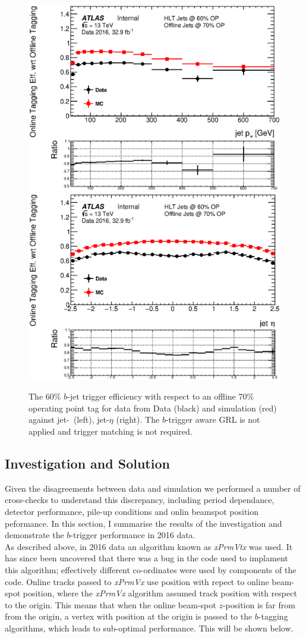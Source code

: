 \begin{figure}[!ht]
  \begin{center}
    \includegraphics[width=0.48\linewidth, angle=0]{figs/trigger/Full_noGRL_eff_noHLTMatch_jetPt.eps}
    \includegraphics[width=0.48\linewidth, angle=0]{figs/trigger/Full_noGRL_eff_noHLTMatch_jetEta.eps}
  \end{center}
  \caption{The 60\% $b$-jet trigger efficiency with respect to an offline 70\% operating point tag
    for data from Data (black) and simulation (red) against jet-\pT~(left), jet-$\eta$ (right).
    The $b$-trigger aware GRL is not applied and trigger matching is not required.}
  \label{fig:trig-Full_noGRL_eff_noHLTMatch}
\end{figure}

\subsection{Investigation and Solution}
\label{sec:trig-inv}

Given the disagreements between data and simulation we performed a number of cross-checks to understand this discrepancy,
including period dependance, detector performance, pile-up conditions and onlin beamspot position peformance.
In this section,
I summarise the results of the investigation
and demonstrate the $b$-trigger performance in 2016 data. \\

As described above, in 2016 data an algorithm known as \textit{xPrmVtx} was used.
It has since been uncovered that there was a bug in the code used to implament this algorithm;
effectively different co-ordinates were used by components of the code.
Online tracks passed to \textit{xPrmVx} use position with repect to online beam-spot position,
where the \textit{xPrmVx} algorithm assumed track position with respect to the origin.
This means that when the online beam-spot $z$-position is far from from the origin,
a vertex with position at the origin is passed to the $b$-tagging algorithms,
which leads to sub-optimal performance.
This will be shown below.

